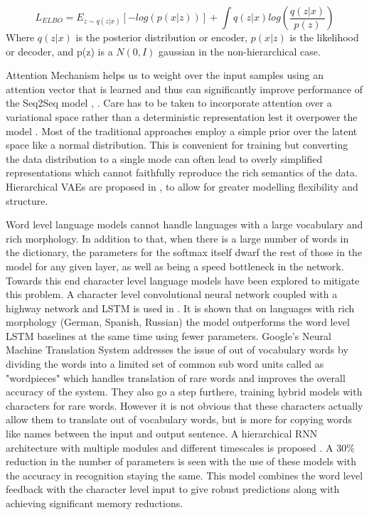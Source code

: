 \documentclass[journal, 12pt, draftcls, onecolumn]{IEEEtran}
\begin{document}
\[L_{ELBO}= E_{z \sim q(z|x)}[-log(p(x|z))] +  \int q(z|x)log(\dfrac{q(z|x)}{p(z)}) \]
Where $q(z|x)$ is the posterior distribution or encoder, $p(x|z)$ is the likelihood or decoder, and p(z) is a $N(0,I)$ gaussian in the non-hierarchical case.

Attention Mechanism helps us to weight over the input samples using an attention vector that is learned and thus can significantly improve performance of the Seq2Seq model \cite{C2}, \cite{C10}. Care has to be taken to incorporate attention over a variational space rather than a deterministic representation lest it overpower the model \cite{C11}.
Most of the traditional approaches employ a simple prior over the latent space like a normal distribution. This is convenient for training but converting the data distribution to a single mode can often lead to overly simplified representations which cannot faithfully reproduce the rich semantics of the data. Hierarchical VAEs are proposed in \cite{C12}, \cite{C13} to allow for greater modelling flexibility and structure.   

Word level language models cannot handle languages with a large vocabulary and rich morphology. In addition to that, when there is a large number of words in the dictionary, the parameters for the softmax itself dwarf the rest of those in the model for any given layer, as well as being a speed bottleneck in the network. Towards this end character level language models have been explored to mitigate this problem. A character level convolutional neural network coupled with a highway network and LSTM is used in \cite{C16}. It is shown that on languages with rich morphology (German, Spanish, Russian) the model outperforms the word level LSTM baselines at the same time using fewer parameters. Google's Neural Machine Translation System \cite{C15} addresses the issue of out of vocabulary words by dividing the words into a limited set of common sub word units called as "wordpieces" which handles translation of rare words and improves the overall accuracy of the system. They also go a step furthere, training hybrid models with characters for rare words. However it is not obvious that these characters actually allow them to translate out of vocabulary words, but is more for copying words like names between the input and output sentence. A hierarchical RNN architecture with multiple modules and different timescales is proposed \cite{C14}. A 30\% reduction in the number of parameters is seen with the use of these models with the accuracy in recognition staying the same. This model combines the word level feedback with the character level input to give robust predictions along with achieving significant memory reductions. 
\end{document}
